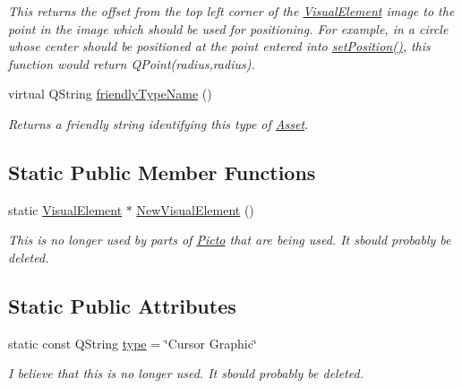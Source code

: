 \begin{DoxyCompactItemize}
\begin{DoxyCompactList}\small\item\em This returns the offset from the top left corner of the \hyperlink{struct_picto_1_1_visual_element}{Visual\-Element} image to the point in the image which should be used for positioning. For example, in a circle whose center should be positioned at the point entered into \hyperlink{struct_picto_1_1_visual_element_a454cc96862097e96a0b0f1d2c83e23ed}{set\-Position()}, this function would return Q\-Point(radius,radius). \end{DoxyCompactList}\item 
virtual Q\-String \hyperlink{class_picto_1_1_cursor_graphic_aa9c53a08fbe9884c0fd4429a03c7deb9}{friendly\-Type\-Name} ()
\begin{DoxyCompactList}\small\item\em Returns a friendly string identifying this type of \hyperlink{class_picto_1_1_asset}{Asset}. \end{DoxyCompactList}\end{DoxyCompactItemize}
\subsection*{Static Public Member Functions}
\begin{DoxyCompactItemize}
\item 
\hypertarget{class_picto_1_1_cursor_graphic_a7a273380d6061cb31c27e1ec7a0d2fed}{static \hyperlink{struct_picto_1_1_visual_element}{Visual\-Element} $\ast$ \hyperlink{class_picto_1_1_cursor_graphic_a7a273380d6061cb31c27e1ec7a0d2fed}{New\-Visual\-Element} ()}\label{class_picto_1_1_cursor_graphic_a7a273380d6061cb31c27e1ec7a0d2fed}

\begin{DoxyCompactList}\small\item\em This is no longer used by parts of \hyperlink{namespace_picto}{Picto} that are being used. It sbould probably be deleted. \end{DoxyCompactList}\end{DoxyCompactItemize}
\subsection*{Static Public Attributes}
\begin{DoxyCompactItemize}
\item 
\hypertarget{class_picto_1_1_cursor_graphic_af8355060e8352fe334363872164fa2cd}{static const Q\-String \hyperlink{class_picto_1_1_cursor_graphic_af8355060e8352fe334363872164fa2cd}{type} = \char`\"{}Cursor Graphic\char`\"{}}\label{class_picto_1_1_cursor_graphic_af8355060e8352fe334363872164fa2cd}

\begin{DoxyCompactList}\small\item\em I believe that this is no longer used. It sbould probably be deleted. \end{DoxyCompactList}\end{DoxyCompactItemize}
